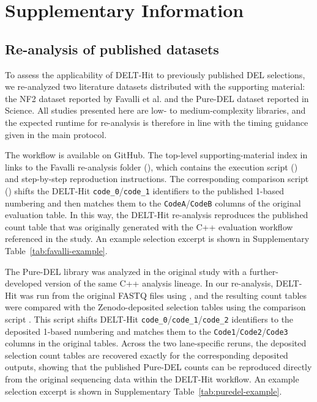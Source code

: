 \clearpage
\appendix
\section*{Supplementary Information}
\providecommand{\benchmarkroot}{..}
\setcounter{secnumdepth}{2}
\setcounter{subsection}{0}
\renewcommand{\thesubsection}{\arabic{subsection}}

\subsection{Re-analysis of published datasets}
\label{supp:analysis-of-published-datasets}

To assess the applicability of DELT-Hit to previously published DEL selections, we re-analyzed two literature datasets distributed with the supporting material: the NF2 dataset reported by Favalli et al.\cite{favalli_stereoregiodefineddnaencoded_2021} and the Pure-DEL dataset reported in Science\cite{keller_highlypurednaencoded_2024}. All studies presented here are low- to medium-complexity libraries, and the expected runtime for re-analysis is therefore in line with the timing guidance given in the main protocol.

{\sloppy
The workflow is available on GitHub. The top-level supporting-material index in  links to the Favalli re-analysis folder (), which contains the execution script () and step-by-step reproduction instructions. The corresponding comparison script () shifts the DELT-Hit \texttt{code\_0}/\texttt{code\_1} identifiers to the published 1-based numbering and then matches them to the \texttt{CodeA}/\texttt{CodeB} columns of the original evaluation table. In this way, the DELT-Hit re-analysis reproduces the published count table that was originally generated with the C++ evaluation workflow referenced in the study. An example selection excerpt is shown in Supplementary Table~\ref{tab:favalli-example}.

The Pure-DEL library was analyzed in the original study with a further-developed version of the same C++ analysis lineage. In our re-analysis, DELT-Hit was run from the original FASTQ files using , and the resulting count tables were compared with the Zenodo-deposited selection tables using the comparison script . This script shifts DELT-Hit \texttt{code\_0}/\texttt{code\_1}/\texttt{code\_2} identifiers to the deposited 1-based numbering and matches them to the \texttt{Code1}/\texttt{Code2}/\texttt{Code3} columns in the original tables. Across the two lane-specific reruns, the deposited selection count tables are recovered exactly for the corresponding deposited outputs, showing that the published Pure-DEL counts can be reproduced directly from the original sequencing data within the DELT-Hit workflow. An example selection excerpt is shown in Supplementary Table~\ref{tab:puredel-example}.
\par}

